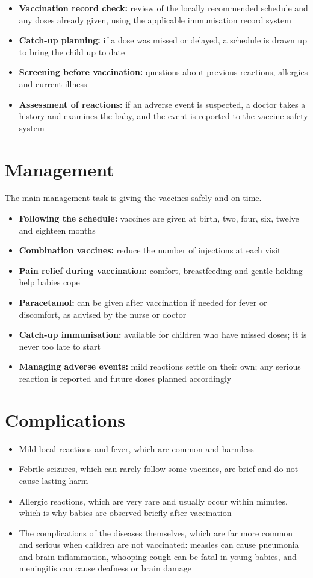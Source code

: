 \begin{itemize}
    \item \textbf{Vaccination record check:} review of the locally recommended schedule and any doses already given, using the applicable immunisation record system
    \item \textbf{Catch-up planning:} if a dose was missed or delayed, a schedule is drawn up to bring the child up to date
    \item \textbf{Screening before vaccination:} questions about previous reactions, allergies and current illness
    \item \textbf{Assessment of reactions:} if an adverse event is suspected, a doctor takes a history and examines the baby, and the event is reported to the vaccine safety system
\end{itemize}

\section*{Management}
The main management task is giving the vaccines safely and on time.

\begin{itemize}
    \item \textbf{Following the schedule:} vaccines are given at birth, two, four, six, twelve and eighteen months
    \item \textbf{Combination vaccines:} reduce the number of injections at each visit
    \item \textbf{Pain relief during vaccination:} comfort, breastfeeding and gentle holding help babies cope
    \item \textbf{Paracetamol:} can be given after vaccination if needed for fever or discomfort, as advised by the nurse or doctor
    \item \textbf{Catch-up immunisation:} available for children who have missed doses; it is never too late to start
    \item \textbf{Managing adverse events:} mild reactions settle on their own; any serious reaction is reported and future doses planned accordingly
\end{itemize}

\section*{Complications}
\begin{itemize}
    \item Mild local reactions and fever, which are common and harmless
    \item Febrile seizures, which can rarely follow some vaccines, are brief and do not cause lasting harm
    \item Allergic reactions, which are very rare and usually occur within minutes, which is why babies are observed briefly after vaccination
    \item The complications of the diseases themselves, which are far more common and serious when children are not vaccinated: measles can cause pneumonia and brain inflammation, whooping cough can be fatal in young babies, and meningitis can cause deafness or brain damage
\end{itemize}

